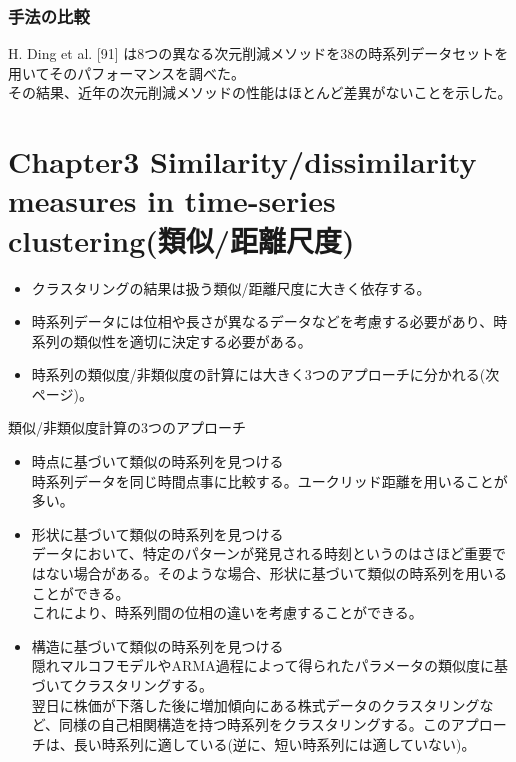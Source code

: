 \documentclass[dvipdfmx,11pt,notheorems]{beamer}
\theoremstyle{definition}
\begin{document}
\begin{frame}\frametitle{手法の比較}
H. Ding et al. [91] は8つの異なる次元削減メソッドを38の時系列データセットを用いてそのパフォーマンスを調べた。\\
その結果、近年の次元削減メソッドの性能はほとんど差異がないことを示した。

\end{frame}


\section{Chapter3 Similarity/dissimilarity measures in time-series clustering(類似/距離尺度)}

\begin{frame}{}
\begin{itemize}
\item クラスタリングの結果は扱う類似/距離尺度に大きく依存する。
\item 時系列データには位相や長さが異なるデータなどを考慮する必要があり、時系列の類似性を適切に決定する必要がある。
\item 時系列の類似度/非類似度の計算には大きく3つのアプローチに分かれる(次ページ)。
\end{itemize}
\end{frame}


\begin{frame}{類似/非類似度計算の3つのアプローチ}
\begin{itemize}
\item 時点に基づいて類似の時系列を見つける\\
時系列データを同じ時間点事に比較する。ユークリッド距離を用いることが多い。
\item 形状に基づいて類似の時系列を見つける\\
データにおいて、特定のパターンが発見される時刻というのはさほど重要ではない場合がある。そのような場合、形状に基づいて類似の時系列を用いることができる。\\
これにより、時系列間の位相の違いを考慮することができる。
\item 構造に基づいて類似の時系列を見つける\\
隠れマルコフモデルやARMA過程によって得られたパラメータの類似度に基づいてクラスタリングする。\\
翌日に株価が下落した後に増加傾向にある株式データのクラスタリングなど、同様の自己相関構造を持つ時系列をクラスタリングする。このアプローチは、長い時系列に適している(逆に、短い時系列には適していない)。
\end{itemize}
\end{frame}
\end{document}
